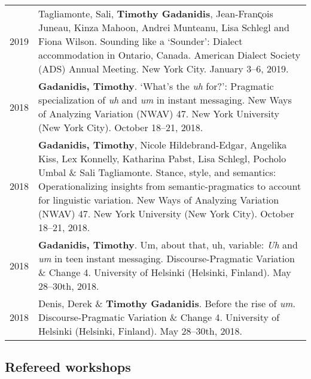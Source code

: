 \documentclass[letterpaper]{article}
\begin{document}
\begin{tabular}{p{}p{}}
    2019 & Tagliamonte, Sali, \textbf{Timothy Gadanidis}, Jean-Fran\k{c}ois
    Juneau, Kinza Mahoon, Andrei Munteanu, Lisa Schlegl and Fiona Wilson.
    Sounding like a `Sounder': Dialect accommodation in Ontario, Canada.
    American Dialect Society (ADS) Annual Meeting. New York City. January 3--6,
    2019. \\
    2018 & \textbf{Gadanidis, Timothy}.  `What’s the \emph{uh} for?': Pragmatic
    specialization of \emph{uh} and \emph{um} in instant messaging.  New Ways of
    Analyzing Variation (NWAV) 47.  New York University (New York City). October
    18--21, 2018. \\
    2018 & \textbf{Gadanidis, Timothy}, Nicole Hildebrand-Edgar, Angelika Kiss,
    Lex Konnelly, Katharina Pabst, Lisa Schlegl, Poc\-holo Umbal \& Sali
    Tagliamonte.  Stance, style, and semantics: Operationalizing insights from
    seman\-tic-pragmatics to account for linguistic variation.  New Ways of
    Analyzing Variation (NWAV) 47. New York University (New York City). October
    18--21, 2018. \\
    2018 & \textbf{Gadanidis, Timothy}.  Um, about that, uh, variable: \emph{Uh}
    and \emph{um} in teen instant messaging.  Discourse-Pragmatic Variation \&
    Change 4. University of Helsinki (Helsinki, Finland). May 28--30th, 2018. \\
    2018 & Denis, Derek \& \textbf{Timothy Gadanidis}.  Before the rise of
    \emph{um}.  Discourse-Pragmatic Variation \& Change 4. University of
    Helsinki (Helsinki, Finland). May 28--30th, 2018. \\
\end{tabular}

\subsection*{Refereed workshops}
\end{document}
